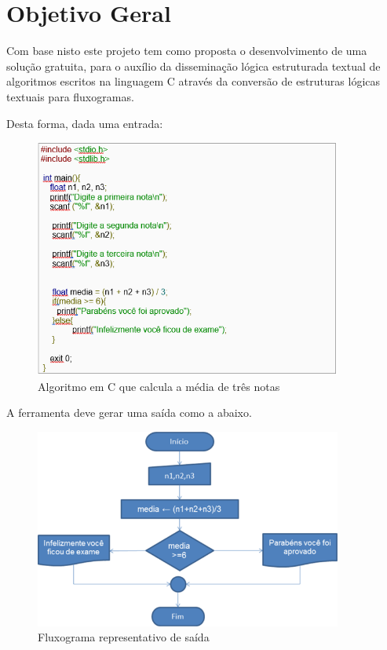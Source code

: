 \section{Objetivo Geral}
Com base nisto este projeto tem como proposta o desenvolvimento de uma solução gratuita, para o auxílio da disseminação lógica estruturada textual de algoritmos escritos na linguagem C através da conversão de estruturas lógicas textuais para fluxogramas. 
\par Desta forma, dada uma entrada:
\begin{figure}[h]
\centering
\includegraphics[width=0.9\textwidth]{figuras/Capturar.PNG}
\caption{Algoritmo em C que calcula a média de três notas}
\label{figuraEntrada}
\end{figure}

\par A ferramenta deve gerar uma saída como a abaixo.
\begin{figure}[h]
\centering
\includegraphics[width=0.9\textwidth]{figuras/fluxograma1.jpg}
\caption{Fluxograma representativo de saída}
\label{figuraSaida}
\end{figure}

